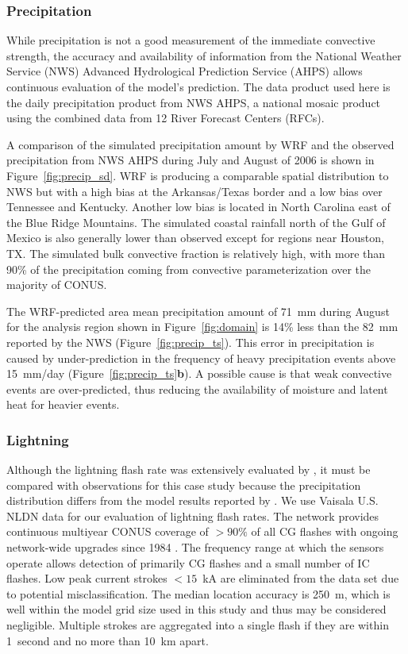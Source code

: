 \subsubsection{Precipitation}

While precipitation is not a good measurement of the immediate convective strength, the
accuracy and availability of information from the National Weather Service (NWS) Advanced
Hydrological Prediction Service (AHPS) allows continuous evaluation of the model's
prediction. The data product used here is the daily precipitation product from NWS AHPS,
a national mosaic product using the combined data from 12 River Forecast Centers (RFCs).

A comparison of the simulated precipitation amount by WRF and
the observed precipitation from NWS AHPS during July and August of 2006 is shown in Figure~\ref{fig:precip_sd}.
WRF is producing a comparable spatial distribution to NWS but with a high bias at the
Arkansas/Texas border and a low bias over Tennessee and Kentucky. Another low bias
is located in North Carolina east of the Blue Ridge Mountains. The simulated coastal
rainfall north of the Gulf of Mexico is also generally lower than observed except for regions
near Houston, TX. The simulated bulk convective fraction is relatively
high, with more than 90\% of the precipitation coming from convective parameterization
over the majority of CONUS.

The WRF-predicted area mean precipitation amount of 71~mm during August for the analysis
region shown in Figure~\ref{fig:domain} is 14\% less than the 82~mm reported by the NWS
(Figure~\ref{fig:precip_ts}). This
error in precipitation is caused by under-prediction in the frequency of heavy precipitation events above
15~mm/day (Figure~\ref{fig:precip_ts}{\bf b}). A possible cause is that weak convective events
are over-predicted, thus reducing the availability of moisture and latent heat for heavier
events.

\subsubsection{Lightning}

Although the lightning flash rate was extensively evaluated by \citet{Wong:2013vn}, it
must be compared with observations for this case study because the precipitation distribution
differs from the model results reported by \citet{Wong:2013vn}.
We use Vaisala U.S. NLDN data for our evaluation of lightning flash
rates. The network provides continuous multiyear CONUS coverage of $>90\%$ of all CG
flashes with ongoing network-wide upgrades since 1984 \citep{Orville:2002uq,Orville:2010uq}.
The frequency range at which the sensors operate allows detection of primarily CG flashes
and a small number of IC flashes. Low peak current strokes $<15$~kA are eliminated from
the data set due to potential misclassification. The median location accuracy is 250~m, which
is well within the model grid size used in this study and thus may be considered negligible.
Multiple strokes are aggregated into a single flash if they are within 1~second and no more
than 10~km apart.

